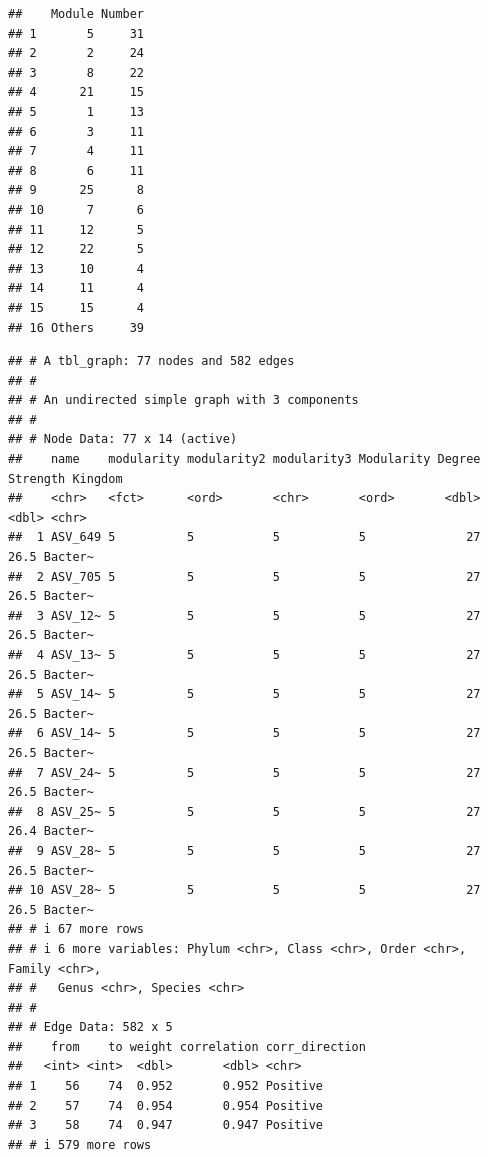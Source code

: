 \documentclass[
]{book}
\newenvironment{Shaded}{\begin{snugshade}}{\end{snugshade}}
\newcommand{\CommentTok}[1]{\textcolor[rgb]{0.56,0.35,0.01}{\textit{#1}}}
\newcommand{\NormalTok}[1]{#1}
\newcommand{\SpecialCharTok}[1]{\textcolor[rgb]{0.81,0.36,0.00}{\textbf{#1}}}
\begin{document}
\begin{verbatim}
##    Module Number
## 1       5     31
## 2       2     24
## 3       8     22
## 4      21     15
## 5       1     13
## 6       3     11
## 7       4     11
## 8       6     11
## 9      25      8
## 10      7      6
## 11     12      5
## 12     22      5
## 13     10      4
## 14     11      4
## 15     15      4
## 16 Others     39
\end{verbatim}

\begin{Shaded}
\end{Shaded}

\begin{verbatim}
## # A tbl_graph: 77 nodes and 582 edges
## #
## # An undirected simple graph with 3 components
## #
## # Node Data: 77 x 14 (active)
##    name    modularity modularity2 modularity3 Modularity Degree Strength Kingdom
##    <chr>   <fct>      <ord>       <chr>       <ord>       <dbl>    <dbl> <chr>  
##  1 ASV_649 5          5           5           5              27     26.5 Bacter~
##  2 ASV_705 5          5           5           5              27     26.5 Bacter~
##  3 ASV_12~ 5          5           5           5              27     26.5 Bacter~
##  4 ASV_13~ 5          5           5           5              27     26.5 Bacter~
##  5 ASV_14~ 5          5           5           5              27     26.5 Bacter~
##  6 ASV_14~ 5          5           5           5              27     26.5 Bacter~
##  7 ASV_24~ 5          5           5           5              27     26.5 Bacter~
##  8 ASV_25~ 5          5           5           5              27     26.4 Bacter~
##  9 ASV_28~ 5          5           5           5              27     26.5 Bacter~
## 10 ASV_28~ 5          5           5           5              27     26.5 Bacter~
## # i 67 more rows
## # i 6 more variables: Phylum <chr>, Class <chr>, Order <chr>, Family <chr>,
## #   Genus <chr>, Species <chr>
## #
## # Edge Data: 582 x 5
##    from    to weight correlation corr_direction
##   <int> <int>  <dbl>       <dbl> <chr>         
## 1    56    74  0.952       0.952 Positive      
## 2    57    74  0.954       0.954 Positive      
## 3    58    74  0.947       0.947 Positive      
## # i 579 more rows
\end{verbatim}
\end{document}

